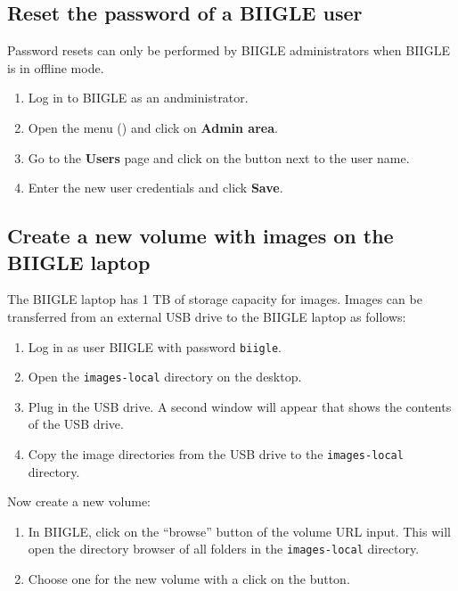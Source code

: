 \subsection*{Reset the password of a BIIGLE user}

Password resets can only be performed by BIIGLE administrators when BIIGLE is in offline mode.

\begin{enumerate}
    \item Log in to BIIGLE as an andministrator.
    \item Open the menu () and click on \textbf{Admin area}.
    \item Go to the \textbf{Users} page and click on the  button next to the user name.
    \item Enter the new user credentials and click \textbf{Save}.
\end{enumerate}

\subsection*{Create a new volume with images on the BIIGLE laptop}

The BIIGLE laptop has 1 TB of storage capacity for images. Images can be transferred from an external USB drive to the BIIGLE laptop as follows:

\begin{enumerate}
    \item Log in as user BIIGLE with password \texttt{biigle}.
    \item Open the \texttt{images-local} directory on the desktop.
    \item Plug in the USB drive. A second window will appear that shows the contents of the USB drive.
    \item Copy the image directories from the USB drive to the \texttt{images-local} directory.
\end{enumerate}

Now create a new volume:

\begin{enumerate}
    \item In BIIGLE, click on the ``browse'' button of the volume URL input.
    This will open the directory browser of all folders in the \texttt{images-local} directory.
    \item Choose one for the new volume with a click on the  button.
\end{enumerate}

